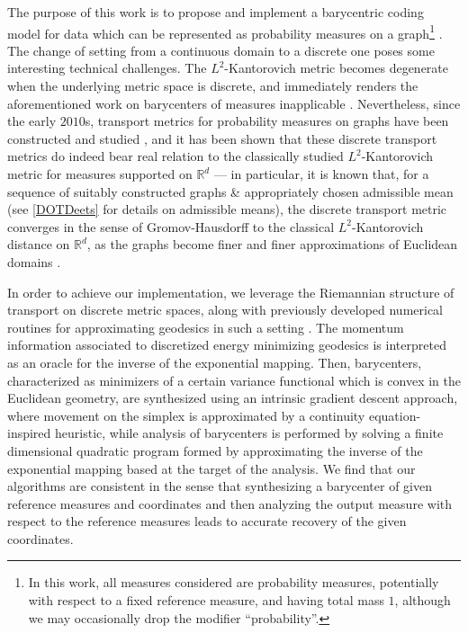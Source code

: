 \documentclass{article}
\newcommand{\R}{\mathbb{R}}
\begin{document}
The purpose of this work is to propose and implement a barycentric coding model for data which can be represented as probability measures on a graph\footnote{In this work, all measures considered are probability measures, potentially with respect to a fixed reference measure, and having total mass \(1\), although we may occasionally drop the modifier ``probability''.} . The change of setting from a continuous domain to a discrete one poses some interesting technical challenges. The \(L^2\)-Kantorovich metric becomes degenerate when the underlying metric space is discrete, and immediately renders the aforementioned work on barycenters of measures inapplicable \cite{maasGradientFlowsEntropy2011}. Nevertheless, since the early \(2010\)s, transport metrics for probability measures on graphs have been constructed and studied \cite{maasGradientFlowsEntropy2011, chowFokkerPlanckEquations2012}, and it has been shown that these discrete transport metrics do indeed bear real relation to the classically studied \(L^2\)-Kantorovich metric for measures supported on \(\R^d\) --- in particular, it is known that, for a sequence of suitably constructed graphs \& appropriately chosen admissible mean (see \ref{DOTDeets} for details on admissible means), the discrete transport metric converges in the sense of Gromov-Hausdorff to the classical \(L^2\)-Kantorovich distance on \(\R^d\), as the graphs become finer and finer approximations of Euclidean domains \cite{gladbachScalingLimitsDiscrete2020, gigliGromovHausdorffConvergenceDiscrete2013, erbarRicciCurvatureFinite2012}.

In order to achieve our implementation, we leverage the Riemannian structure of transport on discrete metric spaces, along with previously developed numerical routines for approximating geodesics in such a setting \cite{erbarComputationOptimalTransport2020}. The momentum information associated to discretized energy minimizing geodesics is interpreted as an oracle for the inverse of the exponential mapping. Then, barycenters, characterized as minimizers of a certain variance functional which is convex in the Euclidean geometry, are synthesized using an intrinsic gradient descent approach, where movement on the simplex is approximated by a continuity equation-inspired heuristic, while analysis of barycenters is performed by solving a finite dimensional quadratic program formed by approximating the inverse of the exponential mapping based at the target of the analysis. We find that our algorithms are consistent in the sense that synthesizing a barycenter of given reference measures and coordinates and then analyzing the output measure with respect to the reference measures leads to accurate recovery of the given coordinates.
\end{document}
